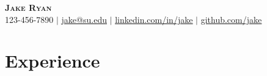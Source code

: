 \documentclass[letterpaper,11pt]{article}
\begin{document}

\begin{center}
    \textbf{\Huge \scshape Jake Ryan} \\ \vspace{1pt}
    \small 123-456-7890 $|$ \href{mailto:x@x.com}{\underline{jake@su.edu}} $|$ 
    \href{https://linkedin.com/in/...}{\underline{linkedin.com/in/jake}} $|$
    \href{https://github.com/...}{\underline{github.com/jake}}
\end{center}


\section{Experience}
\end{document}
